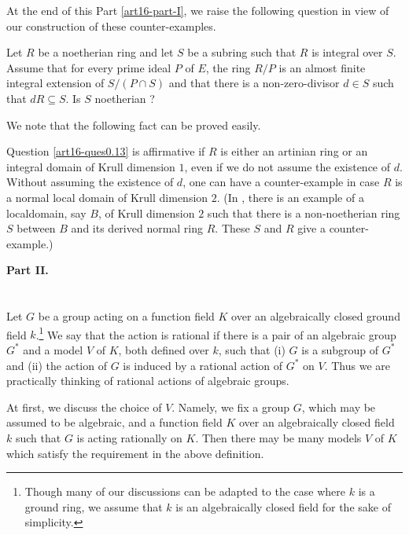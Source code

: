 At the end of this Part \ref{art16-part-I}, we raise the following question in view of our construction of these counter-examples.

\begin{question}\label{art16-ques0.13}
Let $R$ be a noetherian ring and let $S$ be a subring such that $R$ is integral over $S$. Assume that for every prime ideal $P$ of $E$, the ring $R/P$ is an almost finite integral extension of $S/(P\cap S)$ and that there is a non-zero-divisor $d\in S$ such that $dR\subseteq S$. Is $S$ noetherian ?
\end{question}

We note that the following fact can be proved easily.

\begin{remark}\label{art16-rem0.14}
Question \ref{art16-ques0.13} is affirmative if $R$ is either an artinian ring or an integral domain of Krull dimension $1$, even if we do not assume the existence of $d$. Without assuming the existence of $d$, one can have a counter-example in case $R$ is a normal local domain of Krull dimension $2$. (In \cite{art16-key-L}, there is an example of a local\pageoriginale domain, say $B$, of Krull dimension $2$ such that there is a non-noetherian ring $S$ between $B$ and its derived normal ring $R$. These $S$ and $R$ give a counter-example.)
\end{remark}


\bigskip
\begin{center}
{\bf\Large Part II.}
\end{center}

\section{}\label{art16-sec1}
Let $G$ be a group acting on a function field $K$ over an algebraically closed ground field $k$.\footnote{Though many of our discussions can be adapted to the case where $k$ is a ground ring, we assume that $k$ is an algebraically closed field for the sake of simplicity.} We say that the action is rational if there is a pair of an algebraic group $G^{*}$ and a model $V$ of $K$, both defined over $k$, such that (i) $G$ is a subgroup of $G^{*}$ and (ii) the action of $G$ is induced by a rational action of $G^{*}$ on $V$. Thus we are practically thinking of rational actions of algebraic groups.

At first, we discuss the choice of $V$. Namely, we fix a group $G$, which may be assumed to be algebraic, and a function field $K$ over an algebraically closed field $k$ such that $G$ is acting rationally on $K$. Then there may be many models $V$ of $K$ which satisfy the requirement in the above definition.

